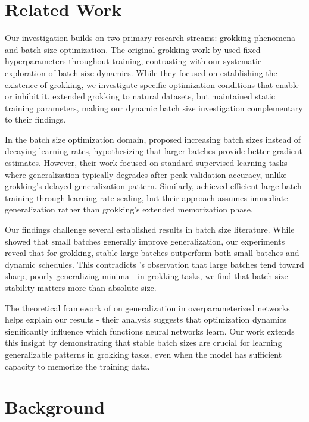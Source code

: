 \documentclass{article} %
\begin{document}
\section{Related Work}
\label{sec:related}

Our investigation builds on two primary research streams: grokking phenomena and batch size optimization. The original grokking work by \citet{power2022grokking} used fixed hyperparameters throughout training, contrasting with our systematic exploration of batch size dynamics. While they focused on establishing the existence of grokking, we investigate specific optimization conditions that enable or inhibit it. \citet{Liu2022OmnigrokGB} extended grokking to natural datasets, but maintained static training parameters, making our dynamic batch size investigation complementary to their findings.

In the batch size optimization domain, \citet{Smith2017DontDT} proposed increasing batch sizes instead of decaying learning rates, hypothesizing that larger batches provide better gradient estimates. However, their work focused on standard supervised learning tasks where generalization typically degrades after peak validation accuracy, unlike grokking's delayed generalization pattern. Similarly, \citet{Goyal2017AccurateLM} achieved efficient large-batch training through learning rate scaling, but their approach assumes immediate generalization rather than grokking's extended memorization phase.

Our findings challenge several established results in batch size literature. While \citet{Masters2018RevisitingSB} showed that small batches generally improve generalization, our experiments reveal that for grokking, stable large batches outperform both small batches and dynamic schedules. This contradicts \citet{Keskar2016OnLT}'s observation that large batches tend toward sharp, poorly-generalizing minima - in grokking tasks, we find that batch size stability matters more than absolute size.

The theoretical framework of \citet{Zhang2016UnderstandingDL} on generalization in overparameterized networks helps explain our results - their analysis suggests that optimization dynamics significantly influence which functions neural networks learn. Our work extends this insight by demonstrating that stable batch sizes are crucial for learning generalizable patterns in grokking tasks, even when the model has sufficient capacity to memorize the training data.

\section{Background}
\label{sec:background}
\end{document}
